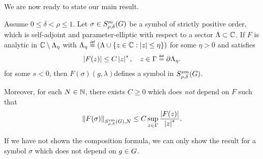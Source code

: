 We are now ready to state our main result.
\begin{theorem}
\label{theorem:functional_calculus}
    Assume $0 \leq \delta < \rho \leq 1$.
    Let $\sigma \in S^{m}_{\rho, \delta}(G)$ be a symbol of strictly positive order,
    which is self-adjoint and parameter-elliptic with respect to a sector $\Lambda \subset \mathbb{C}$.
    If $F$ is analytic in $\mathbb{C} \setminus \Lambda_\eta$
    with $\Lambda_\eta \defeq (\Lambda \cup \{z \in \C : \abs z \leq \eta\})$ for some $\eta > 0$
    and satisfies
    \begin{align*}
        \abs {F(z)} \leq C \abs z^s, \quad z \in \Gamma \defeq \partial \Lambda_\eta.
    \end{align*}
    for some $s < 0$,
    then $F(\sigma)(g, \lambda) $defines a symbol in $S^{s m}_{\rho, \delta}(G)$.

    Moreover,
    for each $N \in \mathbb{N}$,
    there exists $C \geq 0$ which does \emph{not} depend on $F$ such that
    \begin{align}
        \SymbolSemiNorm {s m} {\rho, \delta} N {F(\sigma)} \leq C \sup_{z \in \Gamma} \frac {\abs {F(z)}} {\abs z^s}.
        \label{eq:functional_calculus:bound_on_seminorm}
    \end{align}

    If we have not shown the composition formula,
    we can only show the result for a symbol $\sigma$ which does not depend on $g \in G$.
\end{theorem}
